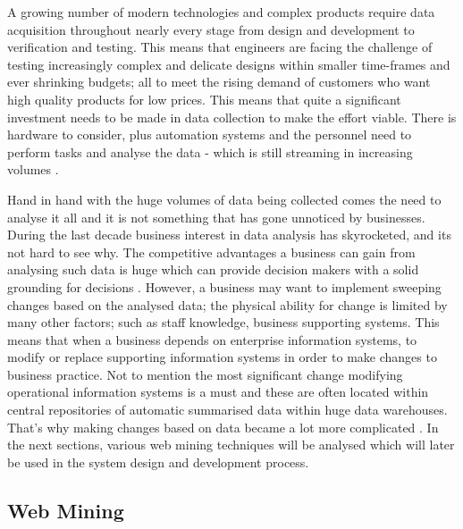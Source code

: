 A growing number of modern technologies and complex products require data acquisition throughout nearly every stage from design and development to verification and testing. This means that engineers are facing the challenge of testing increasingly complex and delicate designs within smaller time-frames and ever shrinking budgets; all to meet the rising demand of customers who want high quality products for low prices. This means that quite a significant investment needs to be made in data collection to make the effort viable. There is hardware to consider, plus automation systems and the personnel need to perform tasks and analyse the data - which is still streaming in increasing volumes \cite{storager}.

Hand in hand with the huge volumes of data being collected comes the need to analyse it all and it is not something that has gone unnoticed by businesses. During the last decade business interest in data analysis has skyrocketed, and its not hard to see why. The competitive advantages a business can gain from analysing such data is huge which can provide decision makers with a solid grounding for decisions \cite{basicbusiness}. However, a business may want to implement sweeping changes based on the analysed data; the physical ability for change is limited by many other factors; such as staff knowledge, business supporting systems. This means that when a business depends on enterprise information systems, to modify or replace supporting information systems in order to make changes to business practice. Not to mention the most significant change modifying operational information systems is a must and these are often located within central repositories of automatic summarised data within huge data warehouses. That's why making changes based on data became a lot more complicated \cite{garcia2014using}. In the next sections, various web mining techniques will be analysed which will later be used in the system design and development process. 

\subsection{Web Mining}

